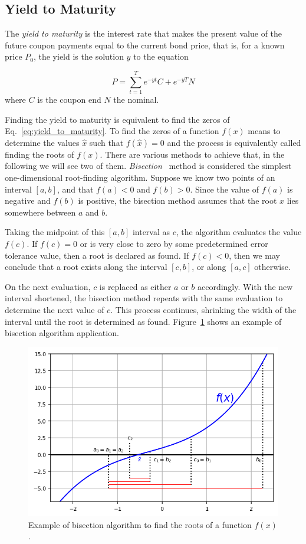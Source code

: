 \subsection{Yield to Maturity}
The \emph{yield to maturity} is the interest rate that makes the present value of the future coupon payments equal to the current bond price, that is, for a known price $P_0$, the yield is the solution $y$ to the equation

\begin{equation}
P = \sum_{t=1}^T e^{-yt}C + e^{-yT}N 
\label{eq:yield_to_maturity}
\end{equation}
where $C$ is the coupon end $N$ the nominal.

Finding the yield to maturity is equivalent to find the zeros of Eq.~\ref{eq:yield_to_maturity}.
To find the zeros of a function $f(x)$ means to determine the values $\hat{x}$ such that $f(\hat{x})=0$ and the process is equivalently called finding the roots of $f(x)$. There are various methods to achieve that, in the following we will see two of them.
\label{sec:root_finding}
\emph{Bisection}~\cite{bib:bisection} method is considered the simplest one-dimensional root-finding algorithm.
Suppose we know two points of an interval $[a,b]$, and that $f(a)< 0$ and $f(b)> 0$.
Since the value of $f(a)$ is negative and $f(b)$ is positive, the bisection method assumes that the root $x$ lies somewhere between $a$ and $b$.

Taking the midpoint of this $[a, b]$ interval as $c$, the algorithm evaluates the value $f(c)$.
If $f(c) = 0$ or is very close to zero by some predetermined error tolerance value, then a root is declared as found. If $f(c)< 0$, then we may conclude that a root exists along the interval $[c, b]$, or along $[a,c]$ otherwise.

On the next evaluation, $c$ is replaced as either $a$ or $b$ accordingly. With the new interval shortened, the bisection method repeats with the same evaluation to determine the next value of $c$. This process continues, shrinking the width of the interval until the root is determined as found. Figure~\ref{fig:bisection} shows an example of bisection algorithm application.

\begin{figure}[htbp]
\centering
\includegraphics[width=0.7\linewidth]{figures/bisection}
\caption{Example of bisection algorithm to find the roots of a function $f(x)$.}
\label{fig:bisection}
\end{figure}

